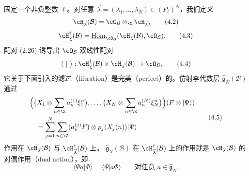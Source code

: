 固定一个非负整数 $\ell$。对任意
$\vec{\lambda}=(\lambda_1,\dots,\lambda_N)\in(P_\ell)^N$，我们定义
\begin{equation}
  \cH_{\vec{\lambda}}(\mathcal{B})
  = \cO_\mathcal{B}\otimes_\C\cH_{\vec{\lambda}}, \tag{4.2}
\end{equation}
\begin{equation}
  \cH_{\vec{\lambda}}^\dagger(\mathcal{B})
  = \underline{\operatorname{Hom}}_{\cO_\mathcal{B}}
    (\cH_{\vec{\lambda}}(\mathcal{B}),\cO_\mathcal{B}) . \tag{4.3}
\end{equation}
配对 (2.26) 诱导出 $\cO_\mathcal{B}$-双线性配对
\begin{equation}
  \langle\ |\ \rangle : \cH_{\vec{\lambda}}^\dagger(\mathcal{B})
  \times\cH_{\vec{\lambda}}(\mathcal{B})\to\cO_\mathcal{B}, \tag{4.4}
\end{equation}
它关于下面引入的滤过（filtration）是完美（perfect）的。仿射李代数层
$\hat{\mathfrak{g}}_N(\mathcal{B})$ 通过
\begin{equation}
  \begin{aligned}
  &\Bigl(\bigl(X_1\otimes\sum_{n\in\Z}a_n^{(1)}\xi_1^n\bigr),\dots,
    \bigl(X_N\otimes\sum_{n\in\Z}a_n^{(N)}\xi_N^n\bigr)\Bigr)
    (F\otimes|\Psi\rangle)\\
  &\quad = \sum_{j=1}^N\sum_{n\in\Z}(a_n^{(j)}F)
    \otimes\rho_j(X_j(n))|\Psi\rangle
  \end{aligned}
  \tag{4.5}
\end{equation}
作用在 $\cH_{\vec{\lambda}}(\mathcal{B})$ 与
$\cH_{\vec{\lambda}}^\dagger(\mathcal{B})$ 上。
$\hat{\mathfrak{g}}_N(\mathcal{B})$ 在
$\cH_{\vec{\lambda}}^\dagger(\mathcal{B})$ 上的作用就是
$\cH_{\vec{\lambda}}(\mathcal{B})$ 的对偶作用（dual action），即
\[
  \langle\Psi a|\Phi\rangle = \langle\Psi|a\Phi\rangle
  \qquad\text{对任意 } a\in\hat{\mathfrak{g}}_N .
\]

